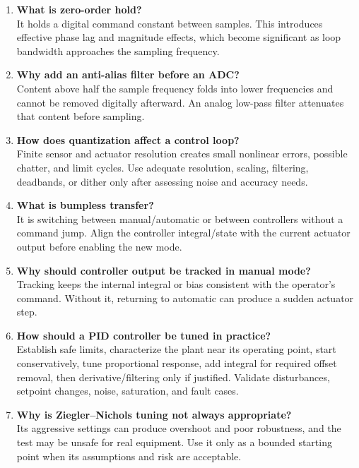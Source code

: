 \documentclass[11pt]{article}
\begin{document}
\begin{enumerate}
\item \textbf{What is zero-order hold?}\\
It holds a digital command constant between samples. This introduces effective phase lag and magnitude effects, which become significant as loop bandwidth approaches the sampling frequency.

\item \textbf{Why add an anti-alias filter before an ADC?}\\
Content above half the sample frequency folds into lower frequencies and cannot be removed digitally afterward. An analog low-pass filter attenuates that content before sampling.

\item \textbf{How does quantization affect a control loop?}\\
Finite sensor and actuator resolution creates small nonlinear errors, possible chatter, and limit cycles. Use adequate resolution, scaling, filtering, deadbands, or dither only after assessing noise and accuracy needs.

\item \textbf{What is bumpless transfer?}\\
It is switching between manual/automatic or between controllers without a command jump. Align the controller integral/state with the current actuator output before enabling the new mode.

\item \textbf{Why should controller output be tracked in manual mode?}\\
Tracking keeps the internal integral or bias consistent with the operator's command. Without it, returning to automatic can produce a sudden actuator step.

\item \textbf{How should a PID controller be tuned in practice?}\\
Establish safe limits, characterize the plant near its operating point, start conservatively, tune proportional response, add integral for required offset removal, then derivative/filtering only if justified. Validate disturbances, setpoint changes, noise, saturation, and fault cases.

\item \textbf{Why is Ziegler--Nichols tuning not always appropriate?}\\
Its aggressive settings can produce overshoot and poor robustness, and the test may be unsafe for real equipment. Use it only as a bounded starting point when its assumptions and risk are acceptable.


\end{enumerate}
\end{document}
